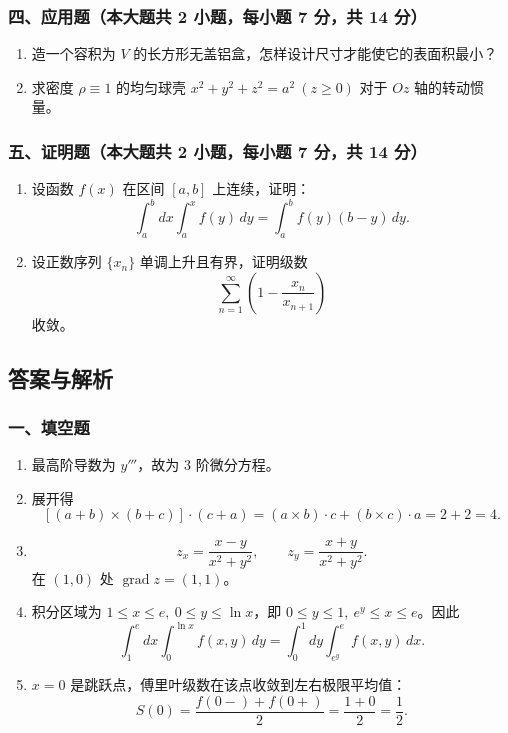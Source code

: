 \subsubsection*{四、应用题（本大题共 2 小题，每小题 7 分，共 14 分）}
\begin{enumerate}
  \item 造一个容积为 $V$ 的长方形无盖铝盒，怎样设计尺寸才能使它的表面积最小？
  \item 求密度 $\rho\equiv1$ 的均匀球壳 $x^2+y^2+z^2=a^2\ (z\ge0)$ 对于 $Oz$ 轴的转动惯量。
\end{enumerate}

\subsubsection*{五、证明题（本大题共 2 小题，每小题 7 分，共 14 分）}
\begin{enumerate}
  \item 设函数 $f(x)$ 在区间 $[a,b]$ 上连续，证明：
  \[
  \int_a^b dx\int_a^x f(y)\,dy=\int_a^b f(y)(b-y)\,dy.
  \]
  \item 设正数序列 $\{x_n\}$ 单调上升且有界，证明级数
  \[
  \sum_{n=1}^{\infty}\left(1-\frac{x_n}{x_{n+1}}\right)
  \]
  收敛。
\end{enumerate}

\subsection{答案与解析}

\subsubsection*{一、填空题}
\begin{enumerate}
  \item 最高阶导数为 $y'''$，故为 $3$ 阶微分方程。
  \item 展开得
  \[
  [(a+b)\times(b+c)]\cdot(c+a)
  =(a\times b)\cdot c+(b\times c)\cdot a=2+2=4.
  \]
  \item
  \[
  z_x=\frac{x-y}{x^2+y^2},\qquad z_y=\frac{x+y}{x^2+y^2}.
  \]
  在 $(1,0)$ 处 $\operatorname{grad}z=(1,1)$。
  \item 积分区域为 $1\le x\le e,\ 0\le y\le\ln x$，即 $0\le y\le1,\ e^y\le x\le e$。因此
  \[
  \int_1^e dx\int_0^{\ln x}f(x,y)\,dy
  =\int_0^1dy\int_{e^y}^e f(x,y)\,dx.
  \]
  \item $x=0$ 是跳跃点，傅里叶级数在该点收敛到左右极限平均值：
  \[
  S(0)=\frac{f(0-)+f(0+)}2=\frac{1+0}{2}=\frac12.
  \]
\end{enumerate}

